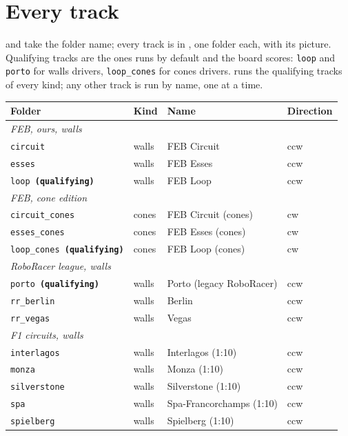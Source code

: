 \documentclass[11pt,a4paper]{article}
\begin{document}
\appendix
\section{Every track}\label{sec:tracks}

 and  take the folder name; every track is in
, one folder each, with its picture. Qualifying tracks are the ones  runs by
default and the board scores: \texttt{loop} and \texttt{porto} for walls drivers, \texttt{loop\_cones} for cones
drivers.  runs the qualifying tracks of every kind; any other track is run by
name, one at a time.

\begin{tabularx}{\linewidth}{llXl}
\toprule
Folder & Kind & Name & Direction \\
\midrule
\multicolumn{4}{l}{\textit{FEB, ours, walls}} \\
\texttt{circuit} & walls & FEB Circuit & ccw \\
\texttt{esses} & walls & FEB Esses & ccw \\
\texttt{loop \textbf{(qualifying)}} & walls & FEB Loop & ccw \\
\midrule
\multicolumn{4}{l}{\textit{FEB, cone edition}} \\
\texttt{circuit\_cones} & cones & FEB Circuit (cones) & cw \\
\texttt{esses\_cones} & cones & FEB Esses (cones) & cw \\
\texttt{loop\_cones \textbf{(qualifying)}} & cones & FEB Loop (cones) & cw \\
\midrule
\multicolumn{4}{l}{\textit{RoboRacer league, walls}} \\
\texttt{porto \textbf{(qualifying)}} & walls & Porto (legacy RoboRacer) & ccw \\
\texttt{rr\_berlin} & walls & Berlin & ccw \\
\texttt{rr\_vegas} & walls & Vegas & ccw \\
\midrule
\multicolumn{4}{l}{\textit{F1 circuits, walls}} \\
\texttt{interlagos} & walls & Interlagos (1:10) & ccw \\
\texttt{monza} & walls & Monza (1:10) & ccw \\
\texttt{silverstone} & walls & Silverstone (1:10) & ccw \\
\texttt{spa} & walls & Spa-Francorchamps (1:10) & ccw \\
\texttt{spielberg} & walls & Spielberg (1:10) & ccw \\

\end{tabularx}
\end{document}
